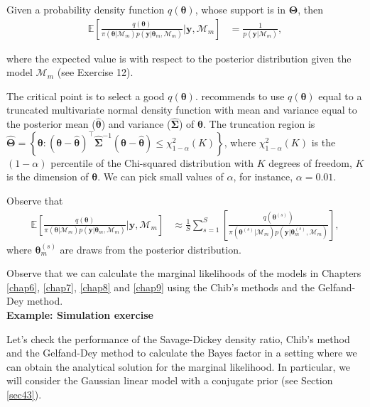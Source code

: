 Given a probability density function $q(\bm{\theta})$, whose support is in $\bm{\Theta}$, then
\begin{align*}
	\mathbb{E}\left[\frac{q(\bm{\theta})}{\pi(\bm{\theta}|\mathcal{M}_m)p(\bm{y}|\bm{\theta}_m,\mathcal{M}_m)}\biggr\rvert \bm{y},\mathcal{M}_m\right]&=\frac{1}{p(\bm{y}|\mathcal{M}_m)},
\end{align*} 

where the expected value is with respect to the posterior distribution given the model $\mathcal{M}_m$ (see Exercise 12).

The critical point is to select a good $q(\bm{\theta})$. \cite{geweke1999using} recommends to use $q(\bm{\theta})$ equal to a truncated multivariate normal density function with mean and variance equal to the posterior mean ($\hat{\bm{\theta}}$) and variance ($\hat{\bm{\Sigma}}$) of $\bm{\theta}$. The truncation region is $\hat{\bm{\Theta}}=\left\{\bm{\theta}:(\bm{\theta}-\hat{\bm{\theta}})^{\top}\hat{\bm{\Sigma}}^{-1}(\bm{\theta}-\hat{\bm{\theta}})\leq \chi_{1-\alpha}^2(K)\right\}$, where $\chi_{1-\alpha}^2(K)$ is the $(1-\alpha)$ percentile of the Chi-squared distribution with $K$ degrees of freedom, $K$ is the dimension of $\bm{\theta}$. We can pick small values of $\alpha$, for instance, $\alpha=0.01$.

Observe that 
\begin{align*}
	\mathbb{E}\left[\frac{q(\bm{\theta})}{\pi(\bm{\theta}|\mathcal{M}_m)p(\bm{y}|\bm{\theta}_m,\mathcal{M}_m)}\biggr\rvert \bm{y},\mathcal{M}_m\right]&\approx \frac{1}{S}\sum_{s=1}^S \left[\frac{q(\bm{\theta}^{(s)})}{\pi(\bm{\theta}^{(s)}|\mathcal{M}_m)p(\bm{y}|\bm{\theta}^{(s)}_m,\mathcal{M}_m)}\right],
\end{align*}
where $\bm{\theta}^{(s)}_m$ are draws from the posterior distribution.

Observe that we can calculate the marginal likelihoods of the models in Chapters \ref{chap6}, \ref{chap7}, \ref{chap8} and \ref{chap9} using the Chib's methods and the Gelfand-Dey method.\\
    

\textbf{Example: Simulation exercise}

Let's check the performance of the Savage-Dickey density ratio, Chib's method and the Gelfand-Dey method to calculate the Bayes factor in a setting where we can obtain the analytical solution for the marginal likelihood. In particular, we will consider the Gaussian linear model with a conjugate prior (see Section \ref{sec43}).

